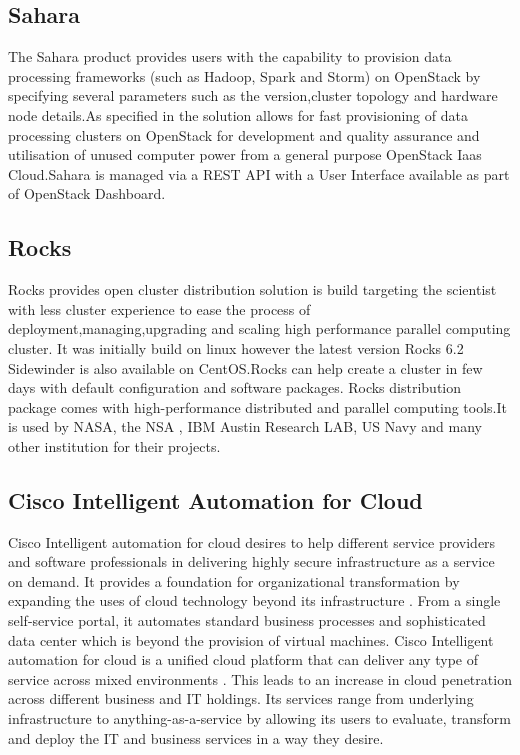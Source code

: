 \subsection{ Sahara}

     The Sahara product provides users with the capability to
     provision data processing frameworks (such as Hadoop, Spark and
     Storm) on OpenStack \cite{www-openStack} by specifying several
     parameters such as the version,cluster topology and hardware node
     details.As specified in \cite{www-Sahara} the solution allows
     for fast provisioning of data processing clusters on OpenStack
     for development and quality assurance and utilisation of unused
     computer power from a general purpose OpenStack Iaas Cloud.Sahara
     is managed via a REST API with a User Interface available as part
     of OpenStack Dashboard.

\subsection{ Rocks}

     \cite{www-rockscluster} Rocks provides open cluster distribution
     solution is build targeting the scientist with less cluster
     experience to ease the process of deployment,managing,upgrading
     and scaling high performance parallel computing cluster.  It was
     initially build on linux however the latest version Rocks 6.2
     Sidewinder is also available on CentOS.Rocks can help create a
     cluster in few days with default configuration and software
     packages.  Rocks distribution package comes with high-performance
     distributed and parallel computing tools.It is used by NASA, the
     NSA , IBM Austin Research LAB, US Navy and many other institution
     for their projects.

\subsection{ Cisco Intelligent Automation for Cloud}

     Cisco Intelligent automation for cloud desires to help different
     service providers and software professionals in delivering highly
     secure infrastructure as a service on demand. It provides a
     foundation for organizational transformation by expanding the
     uses of cloud technology beyond its infrastructure
     \cite{cis1}. From a single self-service portal, it automates
     standard business processes and sophisticated data center which
     is beyond the provision of virtual machines. Cisco Intelligent
     automation for cloud is a unified cloud platform that can deliver
     any type of service across mixed environments \cite{cis2}. This
     leads to an increase in cloud penetration across different
     business and IT holdings. Its services range from underlying
     infrastructure to anything-as-a-service by allowing its users to
     evaluate, transform and deploy the IT and business services in a
     way they desire.

